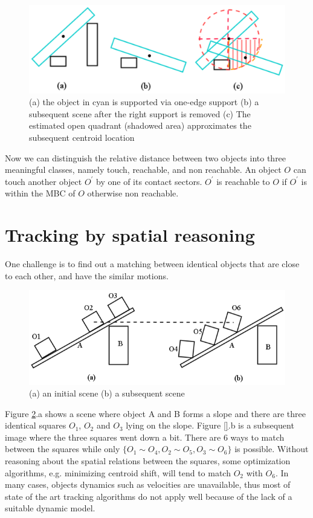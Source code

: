 \documentclass[letterpaper]{article}
\begin{document}
\begin{figure}[h!]\label{QudrantsEstimation}
\centering\includegraphics[scale=0.4]{QudrantsEstimation.png}\caption{(a) the object in cyan is supported via one-edge support  (b) a subsequent scene after the right support is removed (c) The estimated open quadrant (shadowed area) approximates the subsequent centroid location}
\end{figure}

Now we can distinguish the relative distance between two objects into three meaningful classes, namely touch, reachable, and non reachable. An object $O$ can touch another object $O^\prime$ by one of its contact sectors. $O^\prime$ is reachable to $O$ if $O^\prime$ is within the MBC of $O$ otherwise non reachable.



\section{Tracking by spatial reasoning}\label{trackingBySpatialReasoning}

One challenge is to find out a matching between identical objects that are close to each other, and have the similar motions.  
\begin{figure}[h!]\label{SCOExample_2}
\centering\includegraphics[scale=0.3]{SCOScenario_2.png}\caption{(a) an initial scene (b) a subsequent scene}
\end{figure}
Figure \ref{SCOExample_2}.a  shows a scene where object A and B forms a slope and there are three identical squares $O_1$, $O_2$ and $O_3$ lying on the slope. Figure \ref{}.b is a subsequent image where the three squares went down a bit. There are 6 ways to match between the squares while only $\{O_1 \sim O_4, O_2 \sim O_5, O_3 \sim O_6\}$ is possible. Without reasoning about the spatial relations between the squares, some optimization algorithms, e.g. minimizing centroid shift, will tend to match $O_2$ with $O_6$. In many cases, objects dynamics such as velocities are unavailable, thus most of state of the art tracking algorithms do not apply well because of the lack of a suitable dynamic model. 
\end{document}
